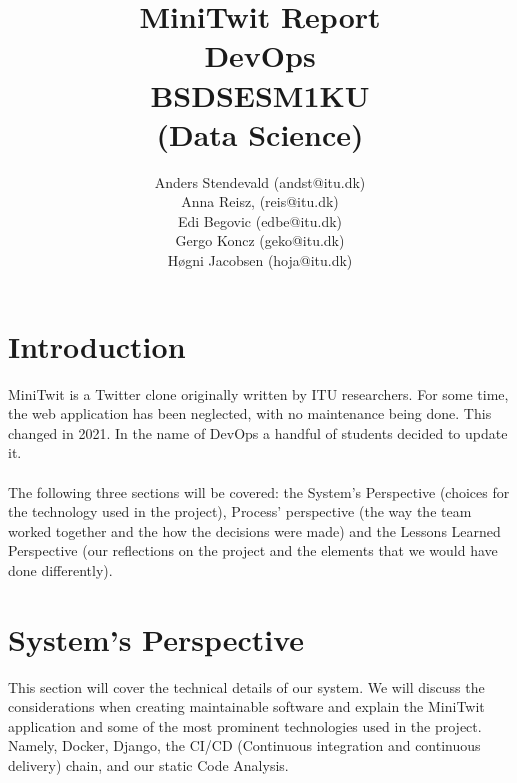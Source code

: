 \documentclass[11pt]{article}
\begin{document}
 
 
\title{MiniTwit Report \\
DevOps \\
BSDSESM1KU \\
(Data Science)}

\author{Anders Stendevald (andst@itu.dk) \\ 
Anna Reisz, (reis@itu.dk) \\ 
Edi Begovic (edbe@itu.dk) \\ 
Gergo Koncz (geko@itu.dk) \\ 
Høgni Jacobsen (hoja@itu.dk)\\
}

\maketitle
\clearpage
\section{Introduction}
MiniTwit is a Twitter clone originally written by ITU researchers. For some time, the web application has been neglected, with no maintenance being done. This changed in 2021. In the name of DevOps a handful of students decided to update it. 
\\\\
The following three sections will be covered: the System's Perspective (choices for the technology used in the project), Process' perspective (the way the team worked together and the how the decisions were made) and the Lessons Learned Perspective (our reflections on the project and the elements that we would have done differently).

\section{System's Perspective}
This section will cover the technical details of our system. We will discuss the considerations when creating maintainable software and explain the MiniTwit application and some of the most prominent technologies used in the project. Namely, Docker, Django, the CI/CD (Continuous integration and continuous delivery) chain, and our static Code Analysis.
\end{document}
